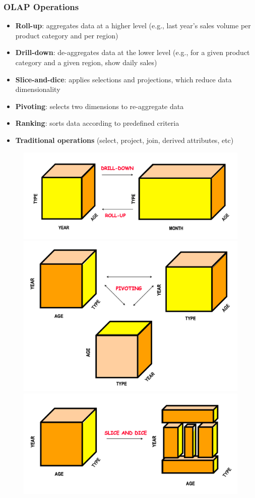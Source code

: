 \documentclass[10pt,a4paper]{article}
\begin{document}
\subsubsection{OLAP Operations}
\begin{itemize}
	\item \textbf{Roll-up}: aggregates data at a higher level (e.g., last year's sales volume per product category and per region)
	\item \textbf{Drill-down}: de-aggregates data at the lower level (e.g., for a given product category and a given region, show daily sales)
	\item \textbf{Slice-and-dice}: applies selections and projections, which reduce data dimensionality
	\item \textbf{Pivoting}: selects two dimensions to re-aggregate data
	\item \textbf{Ranking}: sorts data according to predefined criteria
	\item \textbf{Traditional operations} (select, project, join, derived attributes, etc)
\end{itemize}
\begin{figure}[htp]
\centering
\includegraphics[width=.3\textwidth]{images/olap1}\hfill
\includegraphics[width=.3\textwidth]{images/olap2}\hfill
\includegraphics[width=.3\textwidth]{images/olap3}\hfill
\end{figure}
\pagebreak
\end{document}
